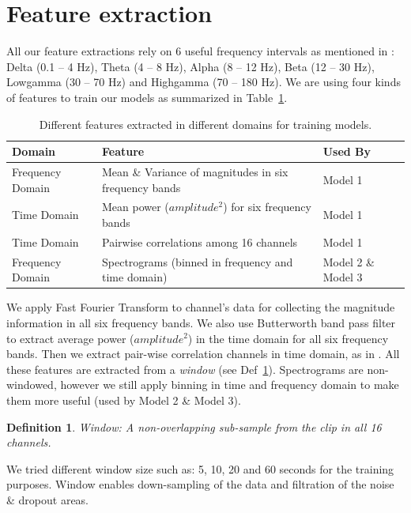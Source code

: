 \documentclass[letterpaper,12pt]{article}
\newtheorem{definition}{Definition}[section]
\begin{document}
\section{Feature extraction}\label{sec:feat}

All our feature extractions rely on 6 useful frequency intervals as mentioned in
\cite{howbert2014forecasting}: Delta (0.1 -- 4 Hz), Theta (4 -- 8 Hz), Alpha (8
-- 12 Hz), Beta (12 -- 30 Hz), Lowgamma (30 -- 70 Hz) and Highgamma (70 -- 180
Hz). We are using four kinds of features to train our models as
summarized in Table~\ref{tab:features}.

\begin{table}[ht]
  \centering
  \begin{tabularx}{\textwidth}{@{}|l|X|l|@{}}
    \toprule
    \textbf{Domain}  & \textbf{Feature}                         & \textbf{Used By}   \\ \midrule
    Frequency Domain & Mean \& Variance of magnitudes in six frequency bands  & Model 1            \\ \midrule
    Time Domain      & Mean power ($amplitude^2$) for six frequency bands & Model 1            \\ \midrule
    Time Domain      & Pairwise correlations among 16 channels              & Model 1            \\ \midrule
    Frequency Domain & Spectrograms (binned in frequency and time domain)                             & Model 2 \& Model 3 \\ \bottomrule
  \end{tabularx}
  \caption{Different features extracted in different domains for training models. \label{tab:features}}
\end{table}

We apply Fast Fourier Transform to channel's data for collecting the magnitude
information in all six frequency bands. We also use Butterworth band pass filter
to extract average power ($amplitude^2$) in the time domain for
all six frequency bands. Then we extract pair-wise correlation channels in
time domain, as in \cite{mirowski2009classification}. All these features are
extracted from a \textit{window} (see Def~\ref{def:window}). Spectrograms are non-windowed, however we
still apply binning in time and frequency domain to make them more useful
(used by Model 2 \& Model 3).

\begin{definition}\label{def:window}{Window:} A non-overlapping sub-sample from the clip in all 16
channels.\end{definition} We tried different window size such as: 5, 10,
20 and 60 seconds for the training purposes. Window enables down-sampling of the data and
filtration of the noise \& dropout areas.
\end{document}
